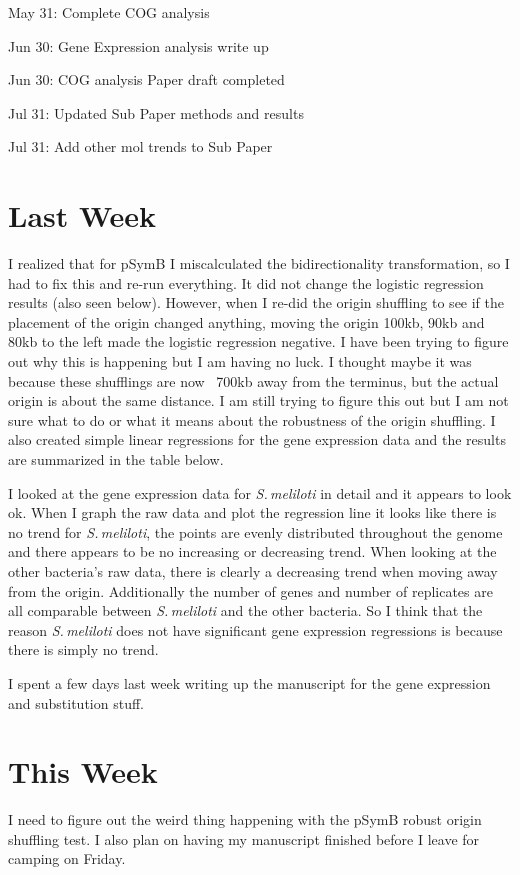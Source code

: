 \documentclass[12pt]{article}
\newcommand{\smel}{\textit{S.\,meliloti}\xspace}
\newcommand{\pb}{pSymB\xspace}
\begin{document}
	May 31:	Complete COG analysis
	
	Jun 30:	Gene Expression analysis write up
	
	Jun 30:	COG analysis Paper draft completed
	
	Jul 31:	Updated Sub Paper methods and results
	
	Jul 31: Add other mol trends to Sub Paper
	
\section*{Last Week}
I realized that for \pb I miscalculated the bidirectionality transformation, so I had to fix this and re-run everything.
It did not change the logistic regression results (also seen below).
However, when I re-did the origin shuffling to see if the placement of the origin changed anything, moving the origin 100kb, 90kb and 80kb to the left made the logistic regression negative. I have been trying to figure out why this is happening but I am having no luck. I thought maybe it was because these shufflings are now ~700kb away from the terminus, but the actual origin is about the same distance. I am still trying to figure this out but I am not sure what to do or what it means about the robustness of the origin shuffling.
I also created simple linear regressions for the gene expression data and the results are summarized in the table below.

I looked at the gene expression data for \smel in detail and it appears to look ok.
When I graph the raw data and plot the regression line it looks like there is no trend for \smel, the points are evenly distributed throughout the genome and there appears to be no increasing or decreasing trend.
When looking at the other bacteria's raw data, there is clearly a decreasing trend when moving away from the origin.
Additionally the number of genes and number of replicates are all comparable between \smel and the other bacteria.
So I think that the reason \smel does not have significant gene expression regressions is because there is simply no trend.

I spent a few days last week writing up the manuscript for the gene expression and substitution stuff.

\section*{This Week}
I need to figure out the weird thing happening with the \pb robust origin shuffling test.
I also plan on having my manuscript finished before I leave for camping on Friday.
\end{document}

